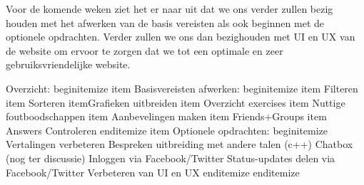 Voor de komende weken ziet het er naar uit dat we ons verder zullen bezig houden met het afwerken van de basis 
vereisten als ook beginnen met de optionele opdrachten. Verder zullen we ons dan bezighouden met UI en UX van de
website om ervoor te zorgen dat we tot een optimale en zeer gebruiksvriendelijke website.

Overzicht:
begin{itemize}
	item Basisvereisten afwerken:
	begin{itemize}
		item Filteren
		item Sorteren
		itemGrafieken uitbreiden
		item Overzicht exercises
		item Nuttige foutboodschappen
		item Aanbevelingen maken
		item Friends+Groups
		item Answers Controleren
	end{itemize}
	item Optionele opdrachten:
	begin{itemize}
		Vertalingen verbeteren
		Bespreken uitbreiding met andere talen (c++)
		Chatbox (nog ter discussie)
		Inloggen via Facebook/Twitter
		Status-updates delen via Facebook/Twitter
		Verbeteren van UI en UX
	end{itemize}
end{itemize}

